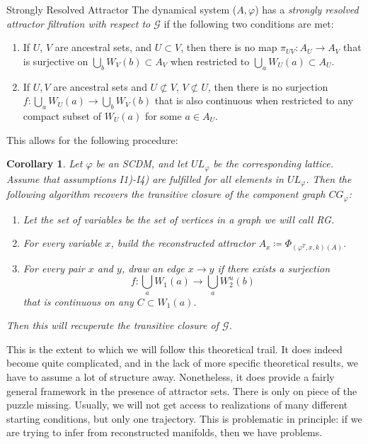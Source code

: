 \documentclass[11pt, a4paper]{memoir}
\theoremstyle{break}
\newtheorem{cor}{Corollary}
\theoremstyle{break}
\theoremstyle{nonumberplain}
\begin{document}
\begin{mydefinition}{Strongly Resolved Attractor}
The dynamical system ($A,\varphi$) has a \emph{strongly resolved attractor filtration with respect to $\mathcal{G}$} if the following two conditions are met:
\begin{enumerate}[label=\arabic*)]
	\item If $U$, $V$ are ancestral sets, and $U\subset V$, then there is no map $\pi_{UV}:A_U\to A_V$ that is surjective on $\bigcup_b W_V(b)\subset A_V$ when restricted to $\bigcup_a W_U(a)\subset A_U$.
	\item If $U,V$ are ancestral sets and $U\not\subset V$, $V\not\subset U$, then there is no surjection $f:\bigcup_{a} W_U(a)\to\bigcup_b W_V(b)$ that is also continuous when restricted to any compact subset of $W_U(a)$ for some $a\in A_U$.
\end{enumerate}
\end{mydefinition}
This allows for the following procedure:
\begin{cor}
Let $\varphi$ be an SCDM, and let $UL_\varphi$ be the corresponding lattice. Assume that assumptions I1)-I4) are fulfilled for all elements in $UL_\varphi$. Then the following algorithm recovers the transitive closure of the component graph $CG_\varphi$:
\begin{enumerate}[label=\roman*.]
	\item Let the set of variables be the set of vertices in a graph we will call \emph{RG}.
	\item For every variable $x$, build the reconstructed attractor $A_x\coloneqq \Phi	_{(\varphi^T,x,k)(A)}$.
	\item For every pair $x$ and $y$, draw an edge $x\to y$ if there exists a surjection
	 $$f:\bigcup_a W_1(a) \to \bigcup_a W_2^u(b)$$ 
	 that is continuous on any $C\subset W_1(a)$.
\end{enumerate}
Then this will recuperate the transitive closure of $\mathcal{G}$.
\end{cor}
This is the extent to which we will follow this theoretical trail. It does indeed become quite complicated, and in the lack of more specific theoretical results, we have to assume a lot of structure away. Nonetheless, it does provide a fairly general framework in the presence of attractor sets. There is only on piece of the puzzle missing. Usually, we will not get access to realizations of many different starting conditions, but only one trajectory. This is problematic in principle: if we are trying to infer from reconstructed manifolds, then we have problems.
\end{document}
